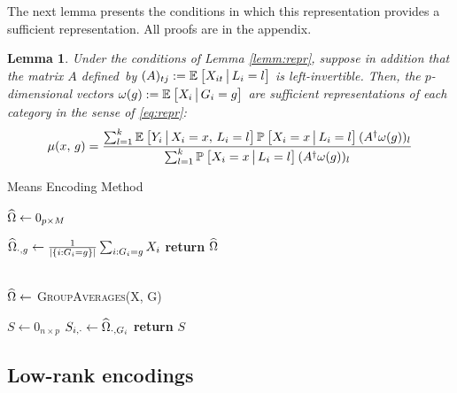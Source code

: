 \documentclass{article}
\theoremstyle{plain}
\newtheorem{lemm}[prop]{Lemma}
\theoremstyle{definition}
\theoremstyle{remark}
\begin{document}
The next lemma presents the conditions in which this representation provides a sufficient representation. All proofs are in the appendix.

\begin{lemm}
\label{lemm:means}
Under the conditions of Lemma \ref{lemm:repr}, suppose in addition that the matrix $A$ defined~by $(A)_{tj} := \mathbb{E}_{}\left[X_{it} \,\big|\, L_{i} = l\right]$
is left-invertible. Then, the $p$-dimensional vectors $\omega(g) := \mathbb{E}_{}\left[X_{i} \,\big|\, G_i = g\right]$ are sufficient representations of each category in the sense of \eqref{eq:repr}:
\begin{equation}
\label{eq:explicit_mom}
\mu(x, \, g) = \frac{\sum_{l = 1}^k  \mathbb{E}_{}\left[Y_i \,\big|\, X_i = x, \, L_i = l\right] \mathbb{P}_{}\left[X_i = x \,\big|\, L_i = l\right] (A^\dagger \omega(g))_l}{\sum_{l = 1}^k \mathbb{P}_{}\left[X_i = x \,\big|\, L_i = l\right] (A^\dagger \omega(g))_l}
\end{equation}
\end{lemm}


\begin{algorithm}
\label{alg:means}
\caption{Means Encoding Method}
\begin{algorithmic}[1]

  \State $\widehat{\Omega} \gets 0_{p \times M}$

  \vspace{0.09cm}
  \State $\widehat{\Omega}_{\cdot,g} \gets \frac{1}{|\{i:G_{i}=g\}|}\sum_{i:G_{i}=g}X_{i}$
  \EndFor
  \State \textbf{return} $\widehat{\Omega}$
  \EndProcedure

  \\

  \State $\widehat{\Omega} \gets$ \textsc{GroupAverages}(X, G)

  \State $S \gets 0_{n \times p}$
  \State $S_{i,\cdot} \gets \widehat{\Omega}_{\cdot,G_{i}}$
  \EndFor
  \State \textbf{return} $S$
  \EndProcedure

\end{algorithmic}
\end{algorithm}





\subsection{Low-rank encodings}
\label{subsec:lowrank}
\end{document}
